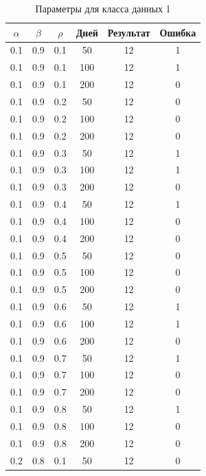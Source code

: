 \documentclass[a4paper,14pt, unknownkeysallowed]{extreport}
\begin{document}
\begin{center}
\captionsetup{justification=raggedright,singlelinecheck=off}
\begin{longtable}[c]{|c|c|c|c|c|c|}
\caption{Параметры для класса данных 1\label{tbl:table_kd1}}
	\\ \hline
	$\alpha$ & $\beta$ & $\rho$ & Дней & Результат & Ошибка 
	\\ \hline
	0.1 &  0.9 &  0.1 &   50 &    12 &     1 \\
	0.1 &  0.9 &  0.1 &  100 &    12 &     1 \\
	0.1 &  0.9 &  0.1 &  200 &    12 &     0 \\
   \hline
	0.1 &  0.9 &  0.2 &   50 &    12 &     0 \\
	0.1 &  0.9 &  0.2 &  100 &    12 &     0 \\
	0.1 &  0.9 &  0.2 &  200 &    12 &     0 \\
   \hline
	0.1 &  0.9 &  0.3 &   50 &    12 &     1 \\
	0.1 &  0.9 &  0.3 &  100 &    12 &     1 \\
	0.1 &  0.9 &  0.3 &  200 &    12 &     0 \\
   \hline
	0.1 &  0.9 &  0.4 &   50 &    12 &     1 \\
	0.1 &  0.9 &  0.4 &  100 &    12 &     0 \\
	0.1 &  0.9 &  0.4 &  200 &    12 &     0 \\
   \hline
	0.1 &  0.9 &  0.5 &   50 &    12 &     0 \\
	0.1 &  0.9 &  0.5 &  100 &    12 &     0 \\
	0.1 &  0.9 &  0.5 &  200 &    12 &     0 \\
   \hline
	0.1 &  0.9 &  0.6 &   50 &    12 &     1 \\
	0.1 &  0.9 &  0.6 &  100 &    12 &     1 \\
	0.1 &  0.9 &  0.6 &  200 &    12 &     0 \\
   \hline
	0.1 &  0.9 &  0.7 &   50 &    12 &     1 \\
	0.1 &  0.9 &  0.7 &  100 &    12 &     0 \\
	0.1 &  0.9 &  0.7 &  200 &    12 &     0 \\
   \hline
	0.1 &  0.9 &  0.8 &   50 &    12 &     1 \\
	0.1 &  0.9 &  0.8 &  100 &    12 &     0 \\
	0.1 &  0.9 &  0.8 &  200 &    12 &     0 \\
   \hline
	0.2 &  0.8 &  0.1 &   50 &    12 &     0 \\

\end{longtable}
\end{center}
\end{document}
